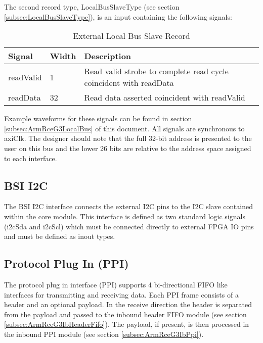 \documentclass[11pt]{article}
\begin{document}
The second record type, LocalBusSlaveType (see section \ref{subsec:LocalBusSlaveType}), is an input containing the following signals:

\begin{table}[H]
\small
\centering
   \begin{tabular}{| l | l | l | }
      \hline \textbf{Signal} & \textbf{Width}  & \textbf{Description} \\
      \hline readValid       & 1               & Read valid strobe to complete read cycle coincident with readData \\
      \hline readData        & 32              & Read data asserted coincident with readValid    \\
      \hline
   \end{tabular}
   \caption{External Local Bus Slave Record}
\end{table}

Example waveforms for these signals can be found in section \ref{subsec:ArmRceG3LocalBus} of this document.  All signals are synchronous to 
axiClk. The designer should note that the full 32-bit address is presented to the user on this bus and the lower 26 bits are relative to the
address space assigned to each interface.

\subsection{BSI I2C}
\label{subsec:external_i2c}

The BSI I2C interface connects the external I2C pins to the I2C slave contained within the core module. This interface is defined as two
standard logic signals (i2cSda and i2cScl) which must be connected directly to external FPGA IO pins and must be defined as inout types. 

\subsection{Protocol Plug In (PPI)}
\label{subsec:external_ib_ppi}

The protocol plug in interface (PPI) supports 4 bi-directional FIFO like interfaces for transmitting and receiving data. Each PPI frame
consists of a header and an optional payload. In the receive direction the header is separated from the payload and passed to the 
inbound header FIFO module (see section \ref{subsec:ArmRceG3IbHeaderFifo}). 
The payload, if present, is then processed in the inbound PPI module (see section \ref{subsec:ArmRceG3IbPpi}). 
\end{document}
